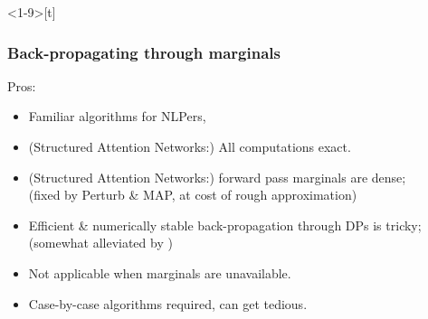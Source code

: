 \begin{frame}<1-9>[t]
\frametitle{Back-propagating through marginals}
{\small Pros:}
\begin{itemize}
    \item<2-> Familiar algorithms for NLPers,
    \item<3-> (Structured Attention Networks:) All computations exact.
\end{itemize}
\begin{itemize}
\item<4-> (Structured Attention Networks:) forward pass marginals are dense;
    \\ \quad (fixed by Perturb \& MAP, at cost of rough approximation)
\item<5-> Efficient \& numerically stable back-propagation through DPs is
    tricky;
    \\ \quad (somewhat alleviated by \citet{arthurdp})
\item<6-> Not applicable when marginals are unavailable.
\item<7-> Case-by-case algorithms required, can get tedious.
\end{itemize}
\end{frame}
